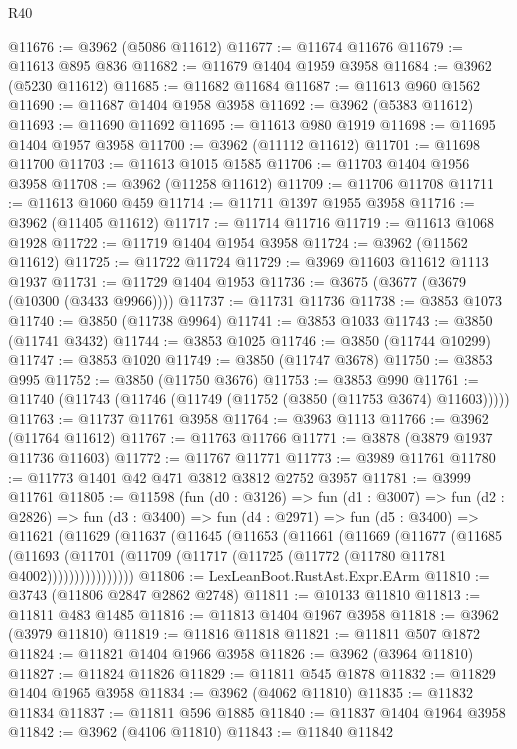 \begin{lexlean}{R40}
\begin{coremodule}
@11676 := @3962 (@5086 @11612)
@11677 := @11674 @11676
@11679 := @11613 @895 @836
@11682 := @11679 @1404 @1959 @3958
@11684 := @3962 (@5230 @11612)
@11685 := @11682 @11684
@11687 := @11613 @960 @1562
@11690 := @11687 @1404 @1958 @3958
@11692 := @3962 (@5383 @11612)
@11693 := @11690 @11692
@11695 := @11613 @980 @1919
@11698 := @11695 @1404 @1957 @3958
@11700 := @3962 (@11112 @11612)
@11701 := @11698 @11700
@11703 := @11613 @1015 @1585
@11706 := @11703 @1404 @1956 @3958
@11708 := @3962 (@11258 @11612)
@11709 := @11706 @11708
@11711 := @11613 @1060 @459
@11714 := @11711 @1397 @1955 @3958
@11716 := @3962 (@11405 @11612)
@11717 := @11714 @11716
@11719 := @11613 @1068 @1928
@11722 := @11719 @1404 @1954 @3958
@11724 := @3962 (@11562 @11612)
@11725 := @11722 @11724
@11729 := @3969 @11603 @11612 @1113 @1937
@11731 := @11729 @1404 @1953
@11736 := @3675 (@3677 (@3679 (@10300 (@3433 @9966))))
@11737 := @11731 @11736
@11738 := @3853 @1073
@11740 := @3850 (@11738 @9964)
@11741 := @3853 @1033
@11743 := @3850 (@11741 @3432)
@11744 := @3853 @1025
@11746 := @3850 (@11744 @10299)
@11747 := @3853 @1020
@11749 := @3850 (@11747 @3678)
@11750 := @3853 @995
@11752 := @3850 (@11750 @3676)
@11753 := @3853 @990
@11761 := @11740 (@11743 (@11746 (@11749 (@11752 (@3850 (@11753 @3674) @11603)))))
@11763 := @11737 @11761 @3958
@11764 := @3963 @1113
@11766 := @3962 (@11764 @11612)
@11767 := @11763 @11766
@11771 := @3878 (@3879 @1937 @11736 @11603)
@11772 := @11767 @11771
@11773 := @3989 @11761
@11780 := @11773 @1401 @42 @471 @3812 @3812 @2752 @3957
@11781 := @3999 @11761
@11805 := @11598
    (fun (d0 : @3126) =>
    fun (d1 : @3007) =>
    fun (d2 : @2826) =>
    fun (d3 : @3400) =>
    fun (d4 : @2971) =>
    fun (d5 : @3400) =>
    @11621
      (@11629
        (@11637
          (@11645
            (@11653
              (@11661
                (@11669
                  (@11677
                    (@11685
                      (@11693
                        (@11701 (@11709 (@11717 (@11725 (@11772 (@11780 @11781 @4002))))))))))))))))
@11806 := LexLeanBoot.RustAst.Expr.EArm
@11810 := @3743 (@11806 @2847 @2862 @2748)
@11811 := @10133 @11810
@11813 := @11811 @483 @1485
@11816 := @11813 @1404 @1967 @3958
@11818 := @3962 (@3979 @11810)
@11819 := @11816 @11818
@11821 := @11811 @507 @1872
@11824 := @11821 @1404 @1966 @3958
@11826 := @3962 (@3964 @11810)
@11827 := @11824 @11826
@11829 := @11811 @545 @1878
@11832 := @11829 @1404 @1965 @3958
@11834 := @3962 (@4062 @11810)
@11835 := @11832 @11834
@11837 := @11811 @596 @1885
@11840 := @11837 @1404 @1964 @3958
@11842 := @3962 (@4106 @11810)
@11843 := @11840 @11842

\end{coremodule}
\end{lexlean}

